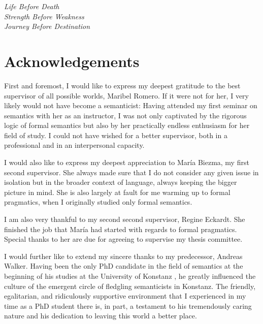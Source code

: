 \cleardoublepage%
\thispagestyle{empty}
%
\hbox{}\vskip 10mm
\begin{flushright}\doublespacing
\textit{\LARGE Life Before Death}\\
\textit{\LARGE Strength Before Weakness}\\
\textit{\LARGE Journey Before Destination}\\\vskip -2mm
\end{flushright}
\enlargethispage{3\baselineskip}\vfill
\begin{center}\singlespacing

\end{center}

\cleardoublepage
\section*{Acknowledgements}%
First and foremost, I would like to express my deepest gratitude to the best supervisor of all possible worlds, Maribel Romero. If it were not for her, I very likely would not have become a semanticist: Having attended my first seminar on semantics with her as an instructor, I was not only captivated by the rigorous logic of formal semantics but also by her practically endless enthusiasm for her field of study. I could not have wished for a better supervisor, both in a professional and in an interpersonal capacity.

I would also like to express my deepest appreciation to Mar\'ia Biezma, my first second supervisor. She always made sure that I do not consider any given issue in isolation but in the broader context of language, always keeping the bigger picture in mind. She is also largely at fault for me warming up to formal pragmatics, when I originally studied only formal semantics.

I am also very thankful to my second second supervisor, Regine Eckardt. She finished the job that Mar\'ia had started with regards to formal pragmatics. Special thanks to her are due for agreeing to supervise my thesis committee.

I would further like to extend my sincere thanks to my predecessor, Andreas Walker. Having been the only PhD candidate in the field of semantics at the beginning of his studies at the University of Konstanz , he greatly influenced the culture of the emergent circle of fledgling semanticists in Konstanz. The friendly, egalitarian, and ridiculously supportive environment that I experienced in my time as a PhD student there is, in part, a testament to his tremendously caring nature and his dedication to leaving this world a better place.

